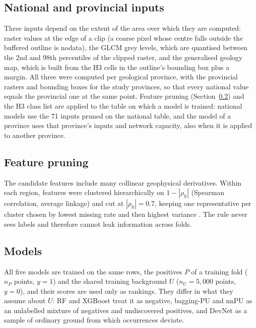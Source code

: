 \documentclass[pdflatex,sn-apa]{sn-jnl}
\begin{document}
\subsection{National and provincial inputs}\label{sec:framework}

Three inputs depend on the extent of the area over which they are computed: raster values at the edge of a clip (a coarse pixel whose centre falls outside the buffered outline is nodata), the GLCM grey levels, which are quantised between the 2nd and 98th percentiles of the clipped raster, and the generalised geology map, which is built from the H3 cells in the outline's bounding box plus a margin. All three were computed per geological province, with the provincial rasters and bounding boxes for the study provinces, so that every national value equals the provincial one at the same point. Feature pruning (Section~\ref{sec:pruning}) and the H3 class list are applied to the table on which a model is trained: national models use the 71 inputs pruned on the national table, and the model of a province uses that province's inputs and network capacity, also when it is applied to another province.

\subsection{Feature pruning}\label{sec:pruning}

The candidate features include many collinear geophysical derivatives. Within each region, features were clustered hierarchically on $1-|\rho_{\mathrm{S}}|$ (Spearman correlation, average linkage) and cut at $|\rho_{\mathrm{S}}| = 0.7$, keeping one representative per cluster chosen by lowest missing rate and then highest variance \citep{Dormann2013}. The rule never sees labels and therefore cannot leak information across folds.

\subsection{Models}\label{sec:models}

All five models are trained on the same rows, the positives $P$ of a training fold ($n_P$ points, $y=1$) and the shared training background $U$ ($n_U = 5{,}000$ points, $y=0$), and their scores are used only as rankings. They differ in what they assume about $U$: RF and XGBoost treat it as negative, bagging-PU and nnPU as an unlabelled mixture of negatives and undiscovered positives, and DevNet as a sample of ordinary ground from which occurrences deviate.
\end{document}
